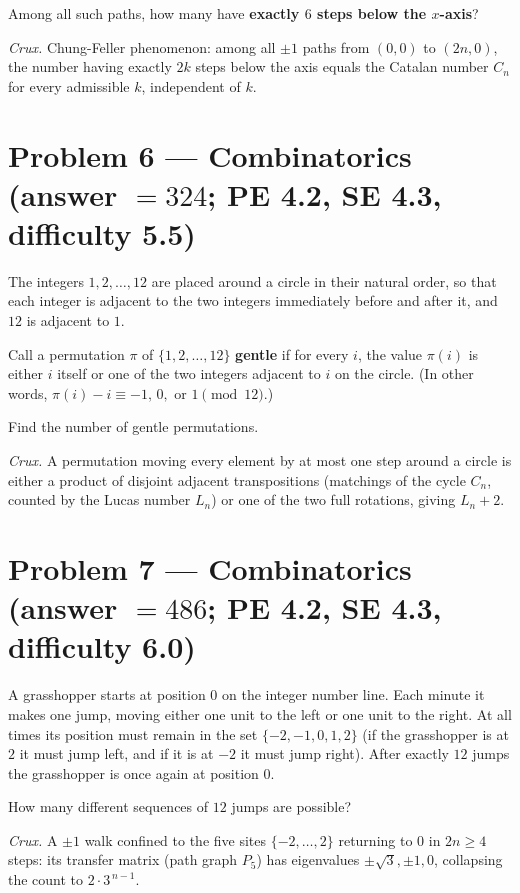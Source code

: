 \documentclass[11pt]{article}
\begin{document}
Among all such paths, how many have \textbf{exactly $6$ steps below the $x$-axis}?

\medskip

\textit{Crux.} Chung-Feller phenomenon: among all $\pm1$ paths from $(0,0)$ to $(2n,0)$, the number having exactly $2k$ steps below the axis equals the Catalan number $C_n$ for every admissible $k$, independent of $k$.

\section*{Problem 6 --- Combinatorics \quad (answer $=324$; PE 4.2, SE 4.3, difficulty 5.5)}

The integers $1,2,\dots,12$ are placed around a circle in their natural order, so that each integer is adjacent to the two integers immediately before and after it, and $12$ is adjacent to $1$.

Call a permutation $\pi$ of $\{1,2,\dots,12\}$ \textbf{gentle} if for every $i$, the value $\pi(i)$ is either $i$ itself or one of the two integers adjacent to $i$ on the circle. (In other words, $\pi(i)-i \equiv -1,\,0,\text{ or }1 \pmod{12}$.)

Find the number of gentle permutations.

\medskip

\textit{Crux.} A permutation moving every element by at most one step around a circle is either a product of disjoint adjacent transpositions (matchings of the cycle $C_n$, counted by the Lucas number $L_n$) or one of the two full rotations, giving $L_n+2$.

\section*{Problem 7 --- Combinatorics \quad (answer $=486$; PE 4.2, SE 4.3, difficulty 6.0)}

A grasshopper starts at position $0$ on the integer number line. Each minute it makes one jump, moving either one unit to the left or one unit to the right. At all times its position must remain in the set $\{-2,-1,0,1,2\}$ (if the grasshopper is at $2$ it must jump left, and if it is at $-2$ it must jump right). After exactly $12$ jumps the grasshopper is once again at position $0$.

How many different sequences of $12$ jumps are possible?

\medskip

\textit{Crux.} A $\pm1$ walk confined to the five sites $\{-2,\dots,2\}$ returning to $0$ in $2n\ge 4$ steps: its transfer matrix (path graph $P_5$) has eigenvalues $\pm\sqrt3,\pm1,0$, collapsing the count to $2\cdot 3^{\,n-1}$.
\end{document}
